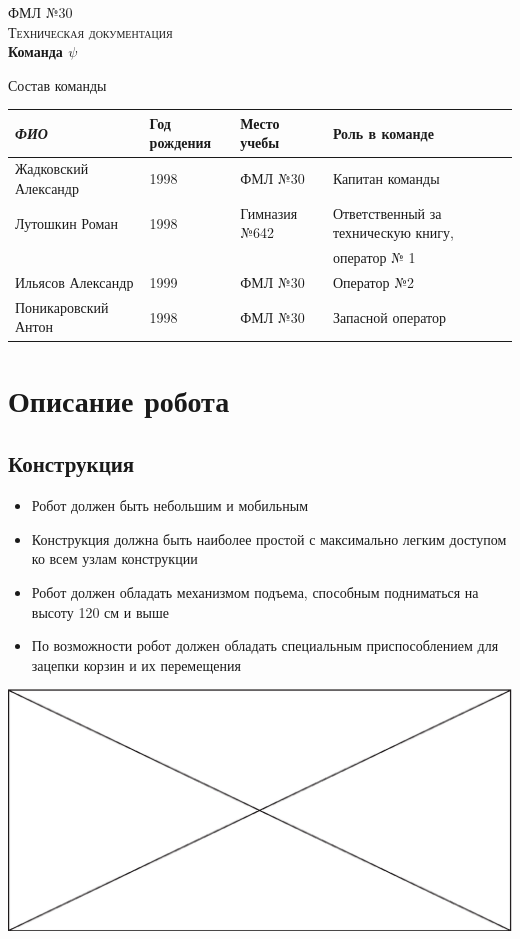 \documentclass[11pt]{article}
\newcommand\measurepage{\dimexpr\pagegoal-\pagetotal-\baselineskip\relax}
\newcommand\fillpage{\includegraphics[width=\textwidth, height=\measurepage]{img/fill_page.eps}}
\begin{document}
   \begin{titlepage}
      \begin{center}
           \textsc{\LARGE{ФМЛ №30}}\\[1.5cm]
	\textsc{\Large Техническая документация}\\[0.5cm]
	{ \huge \bfseries Команда $\psi$ \\[0.4cm] }
      \end{center}
   \end{titlepage}
	\newpage
	
	\LARGE{Состав команды}
		\begin{table}[h]
			\begin{tabular}{|l|l|l|l|}
				\hline
				\textit{ФИО}         & Год рождения & Место учебы   & Роль в команде                      \\ \hline
				Жадковский Александр &  1998        & ФМЛ №30       & Капитан команды                     \\ \hline
				Лутошкин Роман       &  1998        & Гимназия №642 & Ответственный за техническую книгу, \\
				                     &              &               & оператор № 1                        \\ \hline
				Ильясов Александр    &  1999        & ФМЛ №30       & Оператор №2                         \\ \hline
				Поникаровский Антон  & 1998         & ФМЛ №30       & Запасной оператор                   \\ \hline
			\end{tabular}
		\end{table}
		\newpage
		
	\section{Описание робота}
		\subsection{Конструкция}
			\begin{itemize}
				\item Робот должен быть небольшим и мобильным
				\item Конструкция должна быть наиболее простой с максимально легким доступом ко всем узлам конструкции
				\item Робот должен обладать механизмом подъема, способным подниматься на высоту 120 см и выше
				\item По возможности робот должен обладать специальным приспособлением для зацепки корзин и их перемещения
			\end{itemize}
			\fillpage
			
\end{document}
